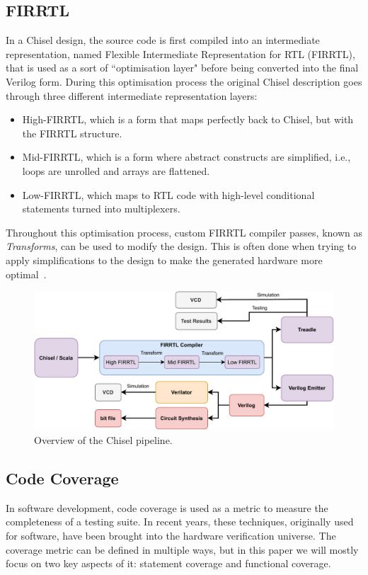 \documentclass[runningheads]{llncs}
\begin{document}
\subsection{FIRRTL}
In a Chisel design, the source code is first compiled into an intermediate representation, named Flexible Intermediate Representation for RTL (FIRRTL), that is used as a sort of ``optimisation layer" before being converted into the final Verilog form. During this optimisation process the original Chisel description goes through three different intermediate representation layers:
\begin{itemize}
\item High-FIRRTL, which is a form that maps perfectly back to Chisel, but with the FIRRTL structure.
\item Mid-FIRRTL, which is a form where abstract constructs are simplified, i.e., loops are unrolled and arrays are flattened.
\item Low-FIRRTL, which maps to RTL code with high-level conditional statements turned into multiplexers.
\end{itemize}
Throughout this optimisation process, custom FIRRTL compiler passes, known as \textit{Transforms}, can be used to modify the design. This is often done when trying to apply simplifications to the design to make the generated hardware more optimal~\cite{firrtl}.  

\begin{figure}
    \centering
    \includegraphics[width=\textwidth]{Chisel_FIRRTL_VERILOG.pdf}
    \caption{Overview of the Chisel pipeline.}
\label{fig:expr}
\end{figure}

\subsection{Code Coverage}
In software development, code coverage is used as a metric to measure the completeness of a testing suite. In recent years, these techniques, originally used for software, have been brought into the hardware verification universe. The coverage metric can be defined in multiple ways, but in this paper we will mostly focus on two key aspects of it: statement coverage and functional coverage. 
\end{document}
